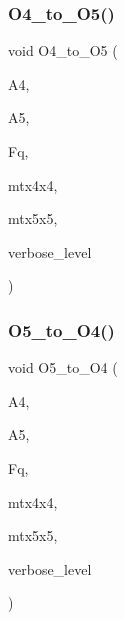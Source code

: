 \subsubsection{\texorpdfstring{O4\+\_\+to\+\_\+\+O5()}{O4\_to\_O5()}}
{\footnotesize\ttfamily void O4\+\_\+to\+\_\+\+O5 (\begin{DoxyParamCaption}\item[{\mbox{\hyperlink{classaction}{action}} $\ast$}]{A4,  }\item[{\mbox{\hyperlink{classaction}{action}} $\ast$}]{A5,  }\item[{\mbox{\hyperlink{classfinite__field}{finite\+\_\+field}} $\ast$}]{Fq,  }\item[{\mbox{\hyperlink{galois_8h_a09fddde158a3a20bd2dcadb609de11dc}{I\+NT}} $\ast$}]{mtx4x4,  }\item[{\mbox{\hyperlink{galois_8h_a09fddde158a3a20bd2dcadb609de11dc}{I\+NT}} $\ast$}]{mtx5x5,  }\item[{\mbox{\hyperlink{galois_8h_a09fddde158a3a20bd2dcadb609de11dc}{I\+NT}}}]{verbose\+\_\+level }\end{DoxyParamCaption})}

\mbox{\label{action__global_8_c_a8c29abd2a0c84f711a3705625de27887}} 
\subsubsection{\texorpdfstring{O5\+\_\+to\+\_\+\+O4()}{O5\_to\_O4()}}
{\footnotesize\ttfamily void O5\+\_\+to\+\_\+\+O4 (\begin{DoxyParamCaption}\item[{\mbox{\hyperlink{classaction}{action}} $\ast$}]{A4,  }\item[{\mbox{\hyperlink{classaction}{action}} $\ast$}]{A5,  }\item[{\mbox{\hyperlink{classfinite__field}{finite\+\_\+field}} $\ast$}]{Fq,  }\item[{\mbox{\hyperlink{galois_8h_a09fddde158a3a20bd2dcadb609de11dc}{I\+NT}} $\ast$}]{mtx4x4,  }\item[{\mbox{\hyperlink{galois_8h_a09fddde158a3a20bd2dcadb609de11dc}{I\+NT}} $\ast$}]{mtx5x5,  }\item[{\mbox{\hyperlink{galois_8h_a09fddde158a3a20bd2dcadb609de11dc}{I\+NT}}}]{verbose\+\_\+level }\end{DoxyParamCaption})}

